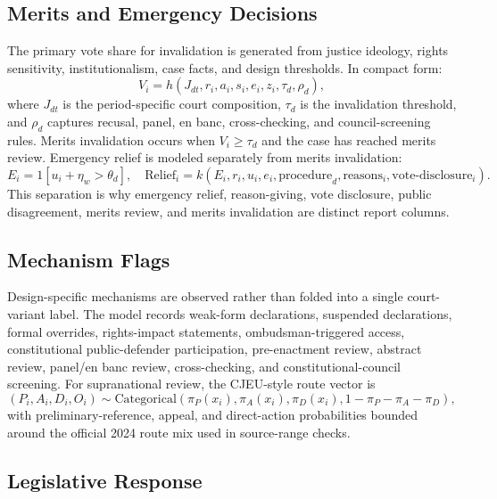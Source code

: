 \subsection*{Merits and Emergency Decisions}

The primary vote share for invalidation is generated from justice ideology, rights sensitivity, institutionalism, case facts, and design thresholds. In compact form:
\[
V_i = h(J_{dt}, r_i, a_i, s_i, e_i, z_i, \tau_d, \rho_d),
\]
where $J_{dt}$ is the period-specific court composition, $\tau_d$ is the invalidation threshold, and $\rho_d$ captures recusal, panel, en banc, cross-checking, and council-screening rules. Merits invalidation occurs when $V_i \geq \tau_d$ and the case has reached merits review. Emergency relief is modeled separately from merits invalidation:
\[
E_i = 1[u_i + \eta_w > \theta_d], \quad
\text{Relief}_i = k(E_i, r_i, u_i, e_i, \text{procedure}_d, \text{reasons}_i, \text{vote-disclosure}_i).
\]
This separation is why emergency relief, reason-giving, vote disclosure, public disagreement, merits review, and merits invalidation are distinct report columns.

\subsection*{Mechanism Flags}

Design-specific mechanisms are observed rather than folded into a single court-variant label. The model records weak-form declarations, suspended declarations, formal overrides, rights-impact statements, ombudsman-triggered access, constitutional public-defender participation, pre-enactment review, abstract review, panel/en banc review, cross-checking, and constitutional-council screening. For supranational review, the CJEU-style route vector is
\[
(P_i,A_i,D_i,O_i) \sim \text{Categorical}(\pi_P(x_i), \pi_A(x_i), \pi_D(x_i), 1-\pi_P-\pi_A-\pi_D),
\]
with preliminary-reference, appeal, and direct-action probabilities bounded around the official 2024 route mix used in source-range checks.

\subsection*{Legislative Response}

